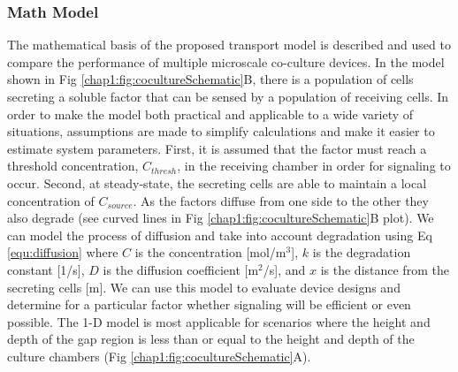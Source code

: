 \subsubsection{Math Model}
\label{SubSubSection:MathModel}
The mathematical basis of the proposed transport model is described and used to compare the performance of multiple microscale co-culture devices. In the model shown in Fig \ref{chap1:fig:cocultureSchematic}B, there is a population of cells secreting a soluble factor that can be sensed by a population of receiving cells. In order to make the model both practical and applicable to a wide variety of situations, assumptions are made to simplify calculations and make it easier to estimate system parameters. First, it is assumed that the factor must reach a threshold concentration, $C_{thresh}$, in the receiving chamber in order for signaling to occur. Second, at steady-state, the secreting cells are able to maintain a local concentration of $C_{source}$. As the factors diffuse from one side to the other they also degrade (see curved lines in Fig \ref{chap1:fig:cocultureSchematic}B plot). We can model the process of diffusion and take into account degradation using Eq \ref{equ:diffusion} where $C$ is the concentration [mol/m$^{3}$], $k$ is the degradation constant [1/s], $D$ is the diffusion coefficient [m$^{2}$/s], and $x$ is the distance from the secreting cells [m]. We can use this model to evaluate device designs and determine for a particular factor whether signaling will be efficient or even possible. The 1-D model is most applicable for scenarios where the height and depth of the gap region is less than or equal to the height and depth of the culture chambers (Fig \ref{chap1:fig:cocultureSchematic}A).



